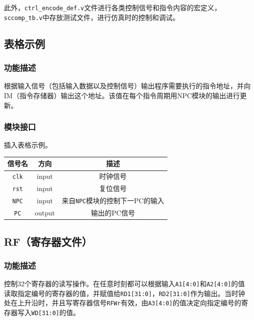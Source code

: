\documentclass[UTF8,a4paper,autofakebold,15pt]{ctexart}
\begin{document}
此外，{\tt ctrl\_encode\_def.v}文件进行各类控制信号和指令内容的宏定义，{\tt sccomp\_tb.v}中存放测试文件，进行仿真时的控制和调试。

\subsection{表格示例}

\subsubsection{功能描述}

	根据输入信号（包括输入数据以及控制信号）输出程序需要执行的指令地址，并向IM（指令存储器）输出这个地址。该值在每个指令周期用NPC模块的输出进行更新。

\subsubsection{模块接口}
	插入表格示例。

	\begin{center}

	\begin{tabular}{|c|c|c|}
		\hline
		信号名&方向&描述\\
		\hline
		{\tt clk}&input&时钟信号\\
		\hline
		{\tt rst}&input&复位信号\\
		\hline
		{\tt NPC}&input&来自{\tt NPC}模块的控制下一PC的输入\\
		\hline
		{\tt PC}&output&输出的PC信号\\
		\hline
	\end{tabular}

	\end{center}

\subsection{RF（寄存器文件）}

\subsubsection{功能描述}

	控制32个寄存器的读写操作。在任意时刻都可以根据输入{\tt A1[4:0]}和{\tt A2[4:0]}的值读取指定编号的寄存器的值，并赋值给{\tt RD1[31:0]}，{\tt RD2[31:0]}作为输出。当时钟处在上升沿时，并且写寄存器信号{\tt RFWr}有效，由{\tt A3[4:0]}的值决定向指定编号的寄存器写入{\tt WD[31:0]}的值。
\end{document}
